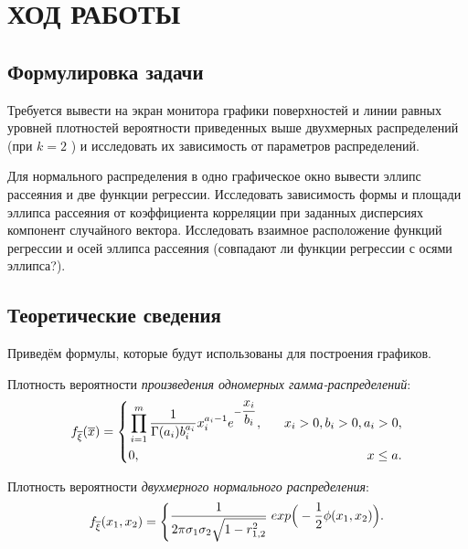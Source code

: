\section{ХОД РАБОТЫ}

\subsection{Формулировка задачи}

Требуется вывести на экран монитора графики поверхностей и линии равных
уровней плотностей вероятности приведенных выше двухмерных распределений
(при $ k = 2 $ ) и исследовать их зависимость от параметров распределений.

Для нормального распределения в одно графическое окно вывести эллипс
рассеяния и две функции регрессии. Исследовать зависимость формы и
площади эллипса рассеяния от коэффициента корреляции при заданных дисперсиях
компонент случайного вектора. Исследовать взаимное расположение
функций регрессии и осей эллипса рассеяния (совпадают ли функции регрессии
с осями эллипса?).

\subsection{Теоретические сведения}

Приведём формулы, которые будут использованы для построения графиков.

Плотность вероятности \textit{произведения одномерных гамма-распределений}:
\begin{equation}
    \begin{aligned}
      f_{\overline{\xi}}(\overline{x}) =
      \left\{
        \begin{aligned}
          &\prod_{i=1}^m \dfrac{1}{\Gamma(a_i)b_i^{a_i}} x_i^{a_i-1} e^{-\dfrac{x_i}{b_i}}, \hspace{3mm} &x_i > 0, b_i > 0, a_i > 0, \\
          &0, \hspace{11.5mm} &x \le a.
        \end{aligned}
      \right.
    \end{aligned}
  \end{equation}

Плотность вероятности \textit{двухмерного нормального распределения}:
\begin{equation}
    \begin{aligned}
      f_{\overline{\xi}}(x_1, x_2) =
      \left\{
        \begin{aligned}
          \dfrac{1}{2 \pi \sigma_1 \sigma_2 \sqrt{1-r_{1,2}^2}} \hspace{1mm} exp \Big(-\dfrac{1}{2}\phi(x_1, x_2) \Big).
        \end{aligned}
      \right.
    \end{aligned}
  \end{equation}

